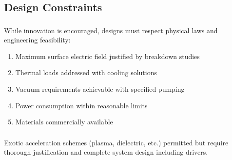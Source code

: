 \subsection{Design Constraints}

\subsubsection{}
While innovation is encouraged, designs must respect physical laws and engineering feasibility:
\begin{enumerate}[noitemsep]
    \item Maximum surface electric field justified by breakdown studies
    \item Thermal loads addressed with cooling solutions
    \item Vacuum requirements achievable with specified pumping
    \item Power consumption within reasonable limits
    \item Materials commercially available
\end{enumerate}

\subsubsection{}
Exotic acceleration schemes (plasma, dielectric, etc.) permitted but require thorough justification and complete system design including drivers.